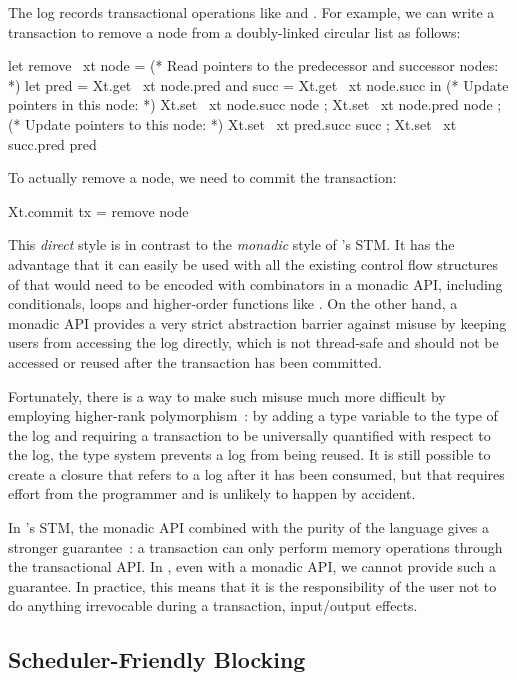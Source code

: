 The log records transactional operations like  and .
For example, we can write a transaction to remove a node from a doubly-linked circular list as follows:
\begin{ocamlcode}
let remove ~xt node =
  (* Read pointers to the predecessor and successor nodes: *)
  let pred = Xt.get ~xt node.pred and succ = Xt.get ~xt node.succ in
  (* Update pointers in this node: *)
  Xt.set ~xt node.succ node ; Xt.set ~xt node.pred node ;
  (* Update pointers to this node: *)
  Xt.set ~xt pred.succ succ ; Xt.set ~xt succ.pred pred
\end{ocamlcode}
To actually remove a node, we need to commit the transaction:
\begin{ocamlcode}
Xt.commit { tx = remove node }
\end{ocamlcode}

This \emph{direct} style is in contrast to the \emph{monadic} style of \Haskell's STM.
It has the advantage that it can easily be used with all the existing control flow structures of \OCaml that would need to be encoded with combinators in a monadic API, including conditionals, loops and higher-order functions like .
On the other hand, a monadic API provides a very strict abstraction barrier against misuse by keeping users from accessing the log directly, which is not thread-safe and should not be accessed or reused after the transaction has been committed.

Fortunately, there is a way to make such misuse much more difficult by employing higher-rank polymorphism~\citep{DBLP:conf/pldi/LaunchburyJ94}: by adding a type variable to the type of the log and requiring a transaction to be universally quantified with respect to the log, the type system prevents a log from being reused.
It is still possible to \eg create a closure that refers to a log after it has been consumed, but that requires effort from the programmer and is unlikely to happen by accident.

In \Haskell's STM, the monadic API combined with the purity of the language gives a stronger guarantee~\citep{DBLP:conf/ppopp/HarrisMPH05}: a transaction can only perform memory operations through the transactional API.
In \OCaml, even with a monadic API, we cannot provide such a guarantee.
In practice, this means that it is the responsibility of the user not to do anything irrevocable during a transaction, \eg input/output effects.

\subsection{Scheduler-Friendly Blocking}
\label{sec:overview_blocking}

